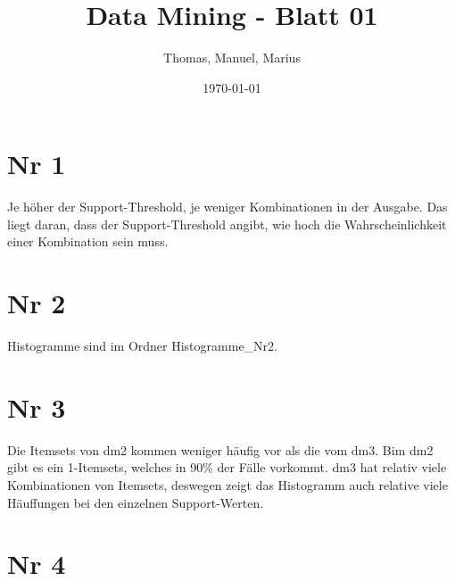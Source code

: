 \documentclass{article}
\title{Data Mining - Blatt 01}
\author{Thomas, Manuel, Marius}
\date{\today}
\begin{document}
\maketitle

\section{Nr 1}
Je höher der Support-Threshold, je weniger Kombinationen in der Ausgabe. Das liegt daran, dass der Support-Threshold angibt, wie hoch die Wahrscheinlichkeit einer Kombination sein muss.

\section{Nr 2}
Histogramme sind im Ordner Histogramme\_Nr2.

\section{Nr 3}
Die Itemsets von dm2 kommen weniger häufig vor als die vom dm3. Bim dm2 gibt es ein 1-Itemsets, welches in 90\% der Fälle vorkommt. dm3 hat relativ viele Kombinationen von Itemsets, deswegen zeigt das Histogramm auch relative viele Häuffungen bei den einzelnen Support-Werten.

\section{Nr 4}
\end{document}
